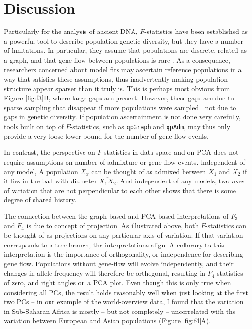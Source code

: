 \documentclass[12pt,a4pape, fullpage]{article}
\begin{document}
\section{Discussion}
Particularly for the analysis of ancient DNA, $F$-statistics have been established as a powerful tool to describe population genetic diversity, but they have a number of limitations. In particular, they assume that populations are discrete, related as a graph, and that gene flow between populations is rare \cite{patterson2012,harney2020}. As a consequence, researchers concerned about model fits may ascertain reference populations in a way that satisfies these assumptions, thus inadvertently making population structure appear sparser than it truly is. This is perhaps most obvious from Figure \ref{fig:f3}B, where large gaps are present. However, these gaps are due to sparse sampling that disappear if more populations were sampled \cite[e.g.][]{peter2020a}, not due to gaps in genetic diversity. If population ascertainment is not done very carefully, tools built on top of $F$-statistics, such as \texttt{qpGraph} and \texttt{qpAdm}, may thus only provide a very loose lower bound for the number of gene flow events.

In contrast, the perspective on $F$-statistics in data space \citep{oteo-garcia2021} and on PCA does not require assumptions on number of admixture or gene flow events. Independent of any model, A population $X_x$ can be thought of as admixed between $ X_1$ and $X_2$ if it lies in the ball with diameter $\overline{X_1X_2}$. And independent of any models, two axes of variation that are not perpendicular to each other shows that there is some degree of shared history. 

The connection between the graph-based and PCA-based interpretations of $F_3$ and $F_4$ is due to concept of projection. As illustrated above, both $F$-statistics can be thought of as projections on any particular axis of variation. If that variation corresponds to a tree-branch, the interpretations align. A collorary to this interpretation is the importance of orthogonality, or independence for describing gene flow. Populations without gene-flow will evolve independently, and their changes in allele frequency will therefore be orthogonal, resulting in $F_4$-statistics of zero, and right angles on a PCA plot. Even though this is only true when considering all PCs, the result holds reasonably well when just looking at the first two PCs -- in our example of the world-overview data, I found that the variation in Sub-Saharan Africa is mostly -- but not completely -- uncorrelated with the variation between European and Asian populations (Figure \ref{fig:f4}A).
\end{document}
